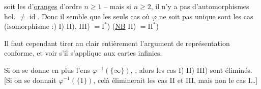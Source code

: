 soit les  d'\uline{oranges} d'ordre $n\geq1$
-- mais si $n\geq2$, il n'y a pas
d'automorphismes hol. $\neq\operatorname{id}$.
Donc il semble que les seuls cas
où $\varphi$ ne soit pas unique sont les cas
(isomorphisme :) I) II), III) $=\mathrm{I}^*$) (\uline{NB} II) $=\mathrm{II}^*$)

Il faut cependant tirer au clair
entièrement l'argument de représentation
conforme, et voir s'il s'applique
aux cartes infinies.

Si on se donne en plus  l'ens
 $\varphi^{-1}(\{\infty\})$, , alors les cas I) II) III)
sont éliminés. [Si on se donnait
$\varphi^{-1}(\{1\})$, celà éliminerait les cas
II et III, mais non le cas I\ldots]
